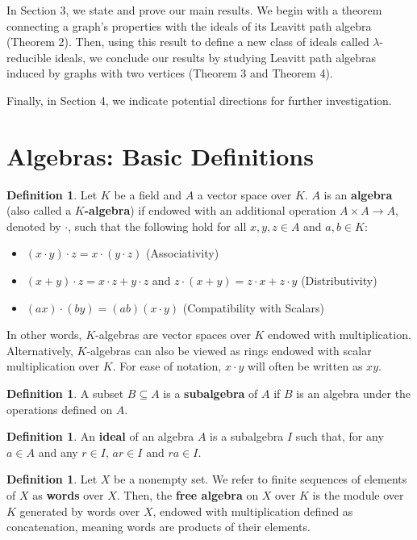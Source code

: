 \documentclass[12pt]{amsart}
\theoremstyle{plain} \numberwithin{equation}{section}
\theoremstyle{definition}
\newtheorem{definition}[theorem]{Definition}
\theoremstyle{definition}
\begin{document}
In Section 3, we state and prove our main results. We begin with a theorem connecting a graph's properties with the ideals of its Leavitt path algebra (Theorem 2). Then, using this result to define a new class of ideals called $\lambda$-reducible ideals, we conclude our results by studying Leavitt path algebras induced by graphs with two vertices (Theorem 3 and Theorem 4). 

Finally, in Section 4, we indicate potential directions for further investigation. 

\section{\textbf{Algebras: Basic Definitions}}

\begin{definition}
    Let $K$ be a field and $A$ a vector space over $K$. $A$ is an \textbf{algebra} (also called a \textbf{$K$-algebra}) if endowed with an additional operation $A\times A\rightarrow A$, denoted by $\cdot$, such that the following hold for all $x,y,z\in A$ and $a,b\in K$:
    \begin{itemize}
        \item[$i$)] $(x\cdot y)\cdot z = x\cdot (y\cdot z)$ (Associativity)
        \item[$ii$)] $(x + y)\cdot z = x\cdot z + y\cdot z$ and $z\cdot (x + y) = z\cdot x + z\cdot y$ (Distributivity)
        \item[$iii$)] $(ax)\cdot (by) = (ab)(x\cdot y)$ (Compatibility with Scalars)
    \end{itemize}
\end{definition}
In other words, $K$-algebras are vector spaces over $K$ endowed with multiplication. Alternatively, $K$-algebras can also be viewed as rings endowed with scalar multiplication over $K$. For ease of notation, $x\cdot y$ will often be written as $xy$. 

\begin{definition}
    A subset $B\subseteq A$ is a \textbf{subalgebra} of $A$ if $B$ is an algebra under the operations defined on $A$. 
\end{definition}

\begin{definition}
    An \textbf{ideal} of an algebra $A$ is a subalgebra $I$ such that, for any $a\in A$ and any $r\in I$, $ar\in I$ and $ra \in I$. 
\end{definition}

\begin{definition}
    Let $X$ be a nonempty set. We refer to finite sequences of elements of $X$ as \textbf{words} over $X$. Then, the \textbf{free algebra} on $X$ over $K$ is the module over $K$ generated by words over $X$, endowed with multiplication defined as concatenation, meaning words are products of their elements. 
\end{definition}
\end{document}
